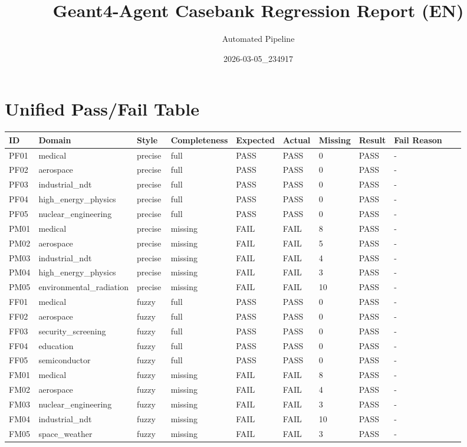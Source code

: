 \documentclass[11pt]{ctexart}
\title{Geant4-Agent Casebank Regression Report (EN)}
\author{Automated Pipeline}
\date{2026-03-05\_234917}
\begin{document}
\maketitle
\section{Unified Pass/Fail Table}
\begin{longtable}{p{0.06\linewidth}p{0.1\linewidth}p{0.08\linewidth}p{0.09\linewidth}p{0.08\linewidth}p{0.08\linewidth}p{0.06\linewidth}p{0.07\linewidth}p{0.28\linewidth}}
\toprule
ID & Domain & Style & Completeness & Expected & Actual & Missing & Result & Fail Reason \\
\midrule
PF01 & medical & precise & full & PASS & PASS & 0 & PASS & - \\
PF02 & aerospace & precise & full & PASS & PASS & 0 & PASS & - \\
PF03 & industrial\_ndt & precise & full & PASS & PASS & 0 & PASS & - \\
PF04 & high\_energy\_physics & precise & full & PASS & PASS & 0 & PASS & - \\
PF05 & nuclear\_engineering & precise & full & PASS & PASS & 0 & PASS & - \\
PM01 & medical & precise & missing & FAIL & FAIL & 8 & PASS & - \\
PM02 & aerospace & precise & missing & FAIL & FAIL & 5 & PASS & - \\
PM03 & industrial\_ndt & precise & missing & FAIL & FAIL & 4 & PASS & - \\
PM04 & high\_energy\_physics & precise & missing & FAIL & FAIL & 3 & PASS & - \\
PM05 & environmental\_radiation & precise & missing & FAIL & FAIL & 10 & PASS & - \\
FF01 & medical & fuzzy & full & PASS & PASS & 0 & PASS & - \\
FF02 & aerospace & fuzzy & full & PASS & PASS & 0 & PASS & - \\
FF03 & security\_screening & fuzzy & full & PASS & PASS & 0 & PASS & - \\
FF04 & education & fuzzy & full & PASS & PASS & 0 & PASS & - \\
FF05 & semiconductor & fuzzy & full & PASS & PASS & 0 & PASS & - \\
FM01 & medical & fuzzy & missing & FAIL & FAIL & 8 & PASS & - \\
FM02 & aerospace & fuzzy & missing & FAIL & FAIL & 4 & PASS & - \\
FM03 & nuclear\_engineering & fuzzy & missing & FAIL & FAIL & 3 & PASS & - \\
FM04 & industrial\_ndt & fuzzy & missing & FAIL & FAIL & 10 & PASS & - \\
FM05 & space\_weather & fuzzy & missing & FAIL & FAIL & 3 & PASS & - \\
\bottomrule
\end{longtable}
\end{document}
